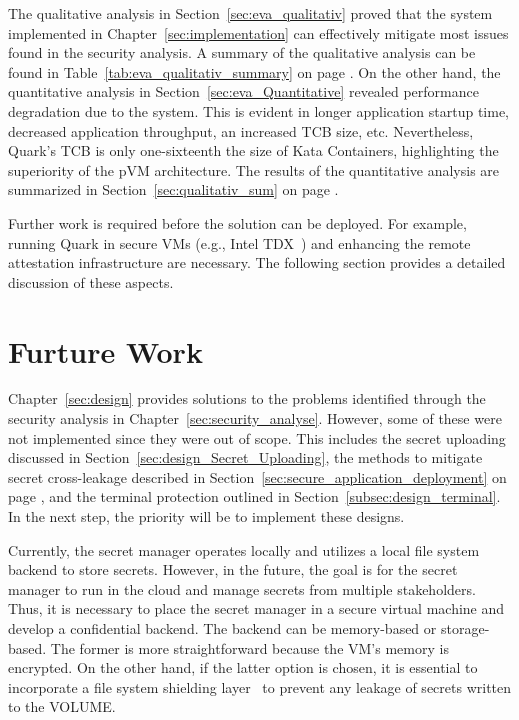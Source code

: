 The qualitative analysis in Section~\ref{sec:eva_qualitativ} proved that the system implemented in Chapter~\ref{sec:implementation} can effectively mitigate most issues found in the security analysis. A summary of the qualitative analysis can be found in Table~\ref{tab:eva_qualitativ_summary} on page \pageref{tab:eva_qualitativ_summary}. 
On the other hand, the quantitative analysis in Section~\ref{sec:eva_Quantitative} revealed performance degradation due to the system. This is evident in longer application startup time, 
decreased application throughput, an increased \acrshort{TCB} size, etc. Nevertheless, Quark's \acrshort{TCB} is only one-sixteenth the size of Kata Containers\cite*{Kata-Containers}, highlighting the superiority of the \acrshort{pVM} architecture. The results of the quantitative analysis 
are summarized in Section~\ref{sec:qualitativ_sum} on page \pageref{sec:qualitativ_sum}.
 
Further work is required before the solution can be deployed. For example, running Quark in secure VMs (e.g., Intel TDX~\cite*{Intel_tdx_whitepaper}) and enhancing the remote attestation infrastructure are necessary. The following section provides a detailed discussion of these aspects.


\section{Furture Work}

Chapter~\ref{sec:design} provides solutions to the problems identified through the security analysis in Chapter~\ref{sec:security_analyse}. However, some of these were not implemented since they were out of scope. This includes the secret uploading discussed in 
Section~\ref{sec:design_Secret_Uploading}, the methods to mitigate secret cross-leakage described in Section~\ref{sec:secure_application_deployment} on page \pageref{eq:1}, and the terminal protection outlined in Section~\ref{subsec:design_terminal}. In the next step, the 
priority will be to implement these designs.

Currently, the secret manager operates locally and utilizes a local file system backend to store secrets. However, in the future, the goal is for the secret manager to run in the cloud and manage secrets from multiple stakeholders. Thus, it is necessary to place the secret manager in 
a secure virtual machine and develop a confidential backend. The backend can be memory-based or storage-based. The former is more straightforward because the VM's memory is encrypted. On the other hand, if the latter option is chosen, it is essential to 
incorporate a file system shielding layer~\cite*{file_system_shield} to prevent any leakage of secrets written to the VOLUME.

